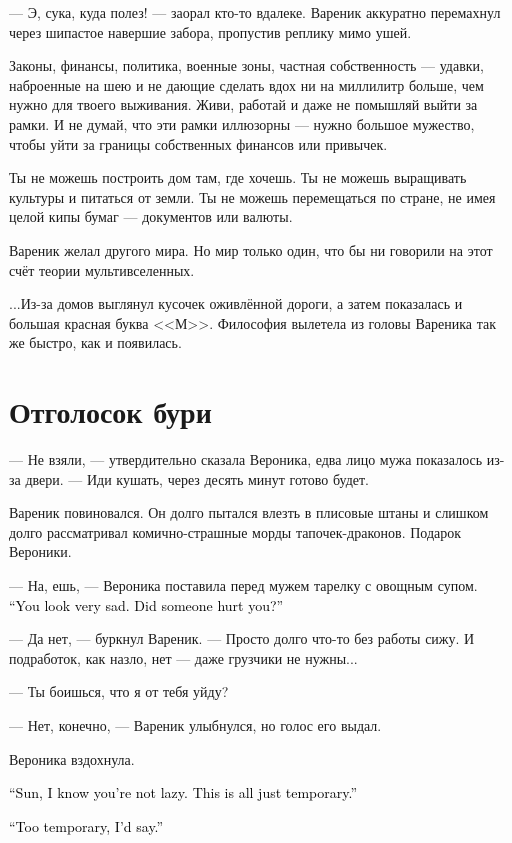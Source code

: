 \documentclass[a4paper,10pt,fleqn]{book}\usepackage{polyglossia}\setdefaultlanguage{english}\setotherlanguage{russian}\defaultfontfeatures{Ligatures=TeX,Mapping=tex-text} \usepackage{xcolor}\definecolor{lightgray}{HTML}{bbbbbb}\color{lightgray}\newcommand{\ml}[3]{\textcolor{black}{#3}}
\begin{document}
--- Э, сука, куда полез! --- заорал кто-то вдалеке.
Вареник аккуратно перемахнул через шипастое навершие забора, пропустив реплику мимо ушей.

Законы, финансы, политика, военные зоны, частная собственность --- удавки, наброенные на шею и не дающие сделать вдох ни на миллилитр больше, чем нужно для твоего выживания.
Живи, работай и даже не помышляй выйти за рамки.
И не думай, что эти рамки иллюзорны --- нужно большое мужество, чтобы уйти за границы собственных финансов или привычек.

Ты не можешь построить дом там, где хочешь.
Ты не можешь выращивать культуры и питаться от земли.
Ты не можешь перемещаться по стране, не имея целой кипы бумаг --- документов или валюты.

Вареник желал другого мира.
Но мир только один, что бы ни говорили на этот счёт теории мультивселенных.

...Из-за домов выглянул кусочек оживлённой дороги, а затем показалась и большая красная буква <<М>>.
Философия вылетела из головы Вареника так же быстро, как и появилась.

\section{Отголосок бури}

--- Не взяли, --- утвердительно сказала Вероника, едва лицо мужа показалось из-за двери.
--- Иди кушать, через десять минут готово будет.

Вареник повиновался.
Он долго пытался влезть в плисовые штаны и слишком долго рассматривал комично-страшные морды тапочек-драконов.
Подарок Вероники.

--- На, ешь, --- Вероника поставила перед мужем тарелку с овощным супом.
\ml{$0$}
{--- Ты очень грустный.}
{``You look very sad.}
\ml{$0$}
{Тебя обидел кто-то?}
{Did someone hurt you?''}

--- Да нет, --- буркнул Вареник.
--- Просто долго что-то без работы сижу.
И подработок, как назло, нет --- даже грузчики не нужны...

--- Ты боишься, что я от тебя уйду?

--- Нет, конечно, --- Вареник улыбнулся, но голос его выдал.

Вероника вздохнула.

\ml{$0$}
{--- Солнце, я знаю, что ты не лентяй.}
{``Sun, I know you're not lazy.}
\ml{$0$}
{Это временные трудности.}
{This is all just temporary.''}

\ml{$0$}
{--- Да какие-то слишком временные.}
{``Too temporary, I'd say.''}
\end{document}
